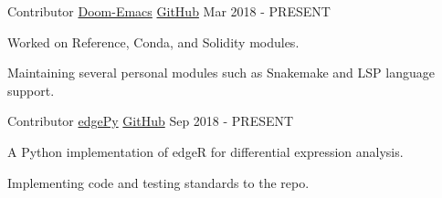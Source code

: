 

\begin{cventries}


	\cventry
	{Contributor} %
	{\href{https://github.com/hlissner/doom-emacs}{Doom-Emacs}} %
	{\href{https://github.com/hlissner/doom-emacs}{GitHub}} %
	{Mar 2018 - PRESENT} %
	{
		\begin{cvitems} %
			\item {Worked on Reference, Conda, and Solidity modules.}
			\item {Maintaining several personal modules such as Snakemake and LSP language support.}
		\end{cvitems}
	}

	\cventry
	{Contributor} %
	{\href{https://github.com/r-bioinformatics/edgePy}{edgePy}} %
	{\href{https://github.com/r-bioinformatics/edgePy}{GitHub}} %
	{Sep 2018 - PRESENT} %
	{
		\begin{cvitems} %
			\item {A Python implementation of edgeR for differential expression analysis.}
			\item {Implementing code and testing standards to the repo.}
		\end{cvitems}
	}


\end{cventries}
